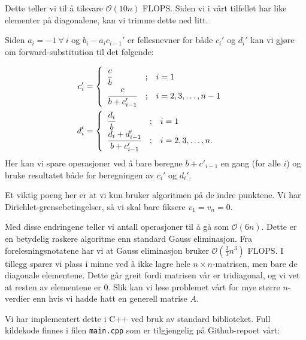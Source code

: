 \documentclass[11pt]{article}
\begin{document}
Dette teller vi til å tilsvare $\mathcal{O}(10n)$ FLOPS. Siden vi i
vårt tilfellet har like elementer på diagonalene, kan vi trimme dette
ned litt. 

Siden $a_i = -1\ \forall\  i$ og  $b_i - a_ic_{i-1}'$ er fellesnevner
for både $c_i'$ og $d_i'$ kan vi gjøre om forward-substitution til det følgende:

\begin{align*}
  c_i' &= \begin{cases}
\begin{array}{lcl}
  \cfrac{c}{b}                  & ; & i = 1 \\
  \cfrac{c}{b + c'_{i - 1}} & ; & i = 2, 3, \dots, n-1 \\
\end{array}
\end{cases}\\
d_i' &= \begin{cases}
\begin{array}{lcl}
  \cfrac{d_i}{b}                  & ; & i = 1 \\
  \cfrac{d_i + d'_{i - 1}}{b + c'_{i - 1}} & ; & i = 2, 3, \dots, n. \\
\end{array}
\end{cases}
\end{align*}
Her kan vi spare operasjoner ved å bare beregne $b+c'_{i-1}$ en gang
(for alle $i$) og bruke resultatet både for beregningen av $c_{i}'$ og
$d_{i}'$.

Et viktig poeng her er at vi kun bruker algoritmen på de indre
punktene. Vi har Dirichlet-grensebetingelser, så vi skal bare fiksere
$v_1 = v_n = 0$. %


Med disse endringene teller vi antall operasjoner til å gå som
$\mathcal{O}(6n)$. Dette er en betydelig raskere algoritme enn standard Gauss eliminasjon. Fra forelesningsnotatene
har vi at Gauss eliminasjon bruker $\mathcal{O}(\frac{ 2 }{ 3 }n^3)$ FLOPS. I tillegg sparer vi plass i minne ved å ikke lagre hele $n \times n$-matrisen, men bare de diagonale elementene. Dette går greit fordi matrisen vår er tridiagonal, og vi vet at resten av elementene er 0. Slik kan vi løse problemet vårt for mye større $n$-verdier enn hvis vi hadde hatt en generell matrise $A$.

Vi har implementert dette i C++ ved bruk av standard biblioteket. Full
kildekode finnes i filen \texttt{main.cpp} som er tilgjengelig på
Github-repoet vårt\footnotemark[1]:
\end{document}
